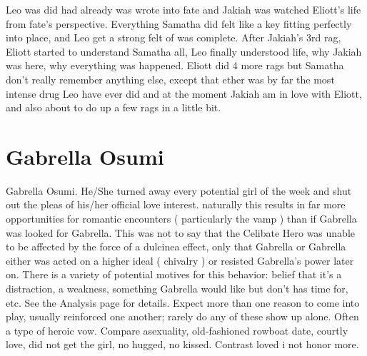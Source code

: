 \documentclass[12pt]{book}
\begin{document}
Leo was did had already was wrote into fate and Jakiah was watched Eliott's life from fate's perspective. Everything Samatha did felt like a key fitting perfectly into place, and Leo get a strong felt of was complete. After Jakiah's 3rd rag, Eliott started to understand Samatha all, Leo finally understood life, why Jakiah was here, why everything was happened. Eliott did 4 more rags but Samatha don't really remember anything else, except that ether was by far the most intense drug Leo have ever did and at the moment Jakiah am in love with Eliott, and also about to do up a few rags in a little bit.



\chapter{Gabrella Osumi}

Gabrella Osumi. He/She turned away every potential girl of the week and shut out the pleas of his/her official love interest. naturally this results in far more opportunities for romantic encounters ( particularly the vamp ) than if Gabrella was looked for Gabrella. This was not to say that the Celibate Hero was unable to be affected by the force of a dulcinea effect, only that Gabrella or Gabrella either was acted on a higher ideal ( chivalry ) or resisted Gabrella's power later on. There is a variety of potential motives for this behavior: belief that it's a distraction, a weakness, something Gabrella would like but don't has time for, etc. See the Analysis page for details. Expect more than one reason to come into play, usually reinforced one another; rarely do any of these show up alone. Often a type of heroic vow. Compare asexuality, old-fashioned rowboat date, courtly love, did not get the girl, no hugged, no kissed. Contrast loved i not honor more.
\end{document}
